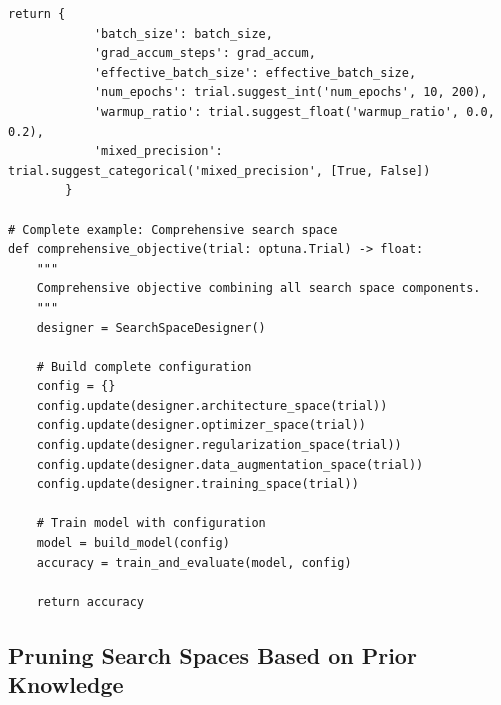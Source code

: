 \begin{lstlisting}[style=python, caption=Search space design patterns]
        return {
            'batch_size': batch_size,
            'grad_accum_steps': grad_accum,
            'effective_batch_size': effective_batch_size,
            'num_epochs': trial.suggest_int('num_epochs', 10, 200),
            'warmup_ratio': trial.suggest_float('warmup_ratio', 0.0, 0.2),
            'mixed_precision': trial.suggest_categorical('mixed_precision', [True, False])
        }

# Complete example: Comprehensive search space
def comprehensive_objective(trial: optuna.Trial) -> float:
    """
    Comprehensive objective combining all search space components.
    """
    designer = SearchSpaceDesigner()

    # Build complete configuration
    config = {}
    config.update(designer.architecture_space(trial))
    config.update(designer.optimizer_space(trial))
    config.update(designer.regularization_space(trial))
    config.update(designer.data_augmentation_space(trial))
    config.update(designer.training_space(trial))

    # Train model with configuration
    model = build_model(config)
    accuracy = train_and_evaluate(model, config)

    return accuracy

\end{lstlisting}

\subsection{Pruning Search Spaces Based on Prior Knowledge}

